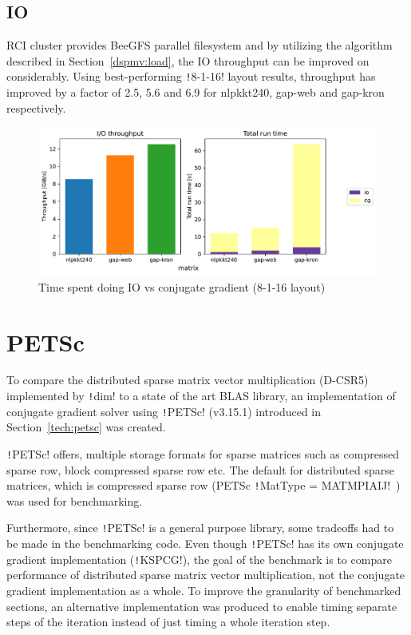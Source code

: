 \documentclass[thesis=M,english]{FITthesis}[2019/12/23]
\newcommand{\csre}[1]{\texttt!#1!}
\begin{document}
\subsection{IO}

RCI cluster provides BeeGFS parallel filesystem and by utilizing the algorithm described in
Section~\ref{dspmv:load}, the IO throughput can be improved on considerably. Using best-performing \csre{8-1-16}
layout results, throughput has improved by a factor of 2.5, 5.6 and 6.9 for nlpkkt240, gap-web
and gap-kron respectively.

\begin{figure}[htp]
    \centering
    \includegraphics[scale=0.58]{static/io_mp.pdf}
    \caption{Time spent doing IO vs conjugate gradient (8-1-16 layout)}
\end{figure}

\section{PETSc}

To compare the distributed sparse matrix vector multiplication (D-CSR5) implemented by \csre{dim}
to a state of the art BLAS library, an
implementation of conjugate gradient solver using \csre{PETSc} (v3.15.1) introduced in
Section~\ref{tech:petsc} was created.

\csre{PETSc} offers,
multiple storage formats for sparse matrices such as compressed sparse row, block compressed
sparse row etc. The default for distributed sparse matrices, which is compressed sparse row
(PETSc \csre{MatType = MATMPIAIJ}~\cite{petsc-user-ref}) was used for benchmarking.

Furthermore, since \csre{PETSc} is a general purpose library, some tradeoffs had to be made
in the benchmarking code. Even though \csre{PETSc} has its own conjugate gradient implementation
(\csre{KSPCG}),
the goal of the benchmark is to compare performance of distributed sparse matrix vector
multiplication, not the conjugate gradient implementation as a whole. To improve the granularity
of benchmarked sections, an alternative
implementation was produced to enable timing separate steps of the iteration instead of just
timing a whole iteration step.
\end{document}
